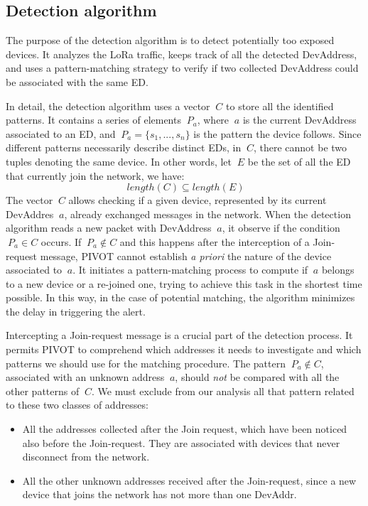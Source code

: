 \subsection{Detection algorithm}
The purpose of the detection algorithm is to detect potentially too exposed devices. It analyzes the LoRa traffic, keeps track of all the detected DevAddress, and uses a pattern-matching strategy to verify if two collected DevAddress could be associated with the same ED.

\vspace{5mm}

In detail, the detection algorithm uses a vector \(\ C \) to store all the identified patterns. It contains a series of elements \(\ P_{a} \), where \(\ a \) is the current DevAddress associated to an ED, and \(\ P_{a} = \{ s_{1}, ..., s_{n} \} \) is the pattern the device follows. Since different patterns necessarily describe distinct EDs, in \(\ C \), there cannot be two tuples denoting the same device. In other words, let \(\ E \) be the set of all the ED that currently join the network, we have:
\[\ length(C) \subseteq length(E ) \]
The vector \(\ C \) allows checking if a given device, represented by its current DevAddres \(\ a \), already exchanged messages in the network. When the detection algorithm reads a new packet with DevAddress \(\ a \), it observe if the condition \(\ P_{a} \in C \) occurs. If \(\ P_{a} \notin C \) and this happens after the interception of a Join-request message, PIVOT  cannot establish \textit{a priori} the nature of the device associated to \(\ a \). It initiates a pattern-matching process to compute if \(\ a \) belongs to a new device or a re-joined one, trying to achieve this task in the shortest time possible. In this way, in the case of potential matching, the algorithm minimizes the delay in triggering the alert.

\vspace{5mm}

Intercepting a Join-request message is a crucial part of the detection process. It permits PIVOT to comprehend which addresses it needs to investigate and which patterns we should use for the matching procedure. The pattern \(\ P_{a} \notin C \), associated with an unknown address \(\ a \), should \textit{not} be compared with all the other patterns of \(\ C \). We must exclude from our analysis all that pattern related to these two classes of addresses:

\vspace{3mm}
\begin{itemize}
	\item All the addresses collected after the Join request, which have been noticed also before the Join-request. They are associated with devices that never disconnect from the network.
	\item All the other unknown addresses received after the Join-request, since a new device that joins the network has not more than one DevAddr.
\end{itemize}
\vspace{3mm}

